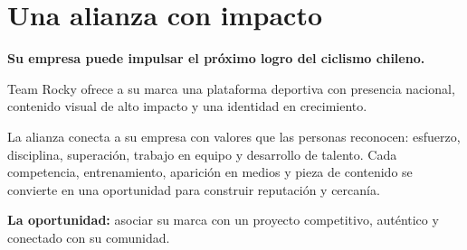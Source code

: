 \section{Una alianza con impacto}

{\fontsize{27}{32}\selectfont\bfseries
Su empresa puede impulsar el próximo logro del ciclismo chileno.\par}

Team Rocky ofrece a su marca una plataforma deportiva con presencia nacional,
contenido visual de alto impacto y una identidad en crecimiento.

La alianza conecta a su empresa con valores que las personas reconocen:
esfuerzo, disciplina, superación, trabajo en equipo y desarrollo de talento.
Cada competencia, entrenamiento, aparición en medios y pieza de contenido se
convierte en una oportunidad para construir reputación y cercanía.



\textbf{La oportunidad:} asociar su marca con un proyecto competitivo,
auténtico y conectado con su comunidad.
\newpage
